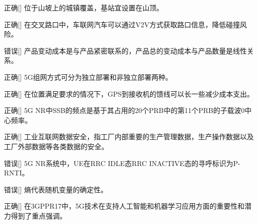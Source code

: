 \begin{choice}{\;正确\;}[]
    位于山坡上的城镇覆盖，基站宜设置在山顶。

\end{choice}


\begin{choice}{\;正确\;}[]
    在交叉路口中，车联网汽车可以通过V2V方式获取路口信息，降低碰撞风险。

\end{choice}


\begin{choice}{\;错误\;}[]
    产品变动成本是与产品紧密联系的，产品总的变动成本与产品数量是线性关系。

\end{choice}


\begin{choice}{\;正确\;}[]
    5G组网方式可分为独立部署和非独立部署两种。

\end{choice}


\begin{choice}{\;正确\;}[]
    在位置满足要求的情况下，GPS到接收机的馈线可以长一些减少成本支出。

\end{choice}


\begin{choice}{\;正确\;}[]
    5G NR中SSB的频点是基于其占用的20个PRB中的第11个PRB的子载波0中心频率。

\end{choice}


\begin{choice}{\;正确\;}[]
    工业互联网数据安全，指工厂内部重要的生产管理数据，生产操作数据以及工厂外部数据等各类数据的安全。

\end{choice}


\begin{choice}{\;错误\;}[]
    5G NR系统中，UE在RRC IDLE态RRC INACTIVE态的寻呼标识为P-RNTI。

\end{choice}


\begin{choice}{\;错误\;}[]
    熵代表随机变量的确定性。

\end{choice}

\begin{choice}{\;正确\;}[]
    在3GPP\;R17中，5G技术在支持人工智能和机器学习应用方面的重要性和潜力得到了重点强调。

\end{choice}

